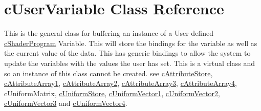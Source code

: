 \hypertarget{classc_user_variable}{
\section{cUserVariable Class Reference}
\label{classc_user_variable}
}


This is the general class for buffering an instance of a User defined \hyperlink{classc_shader_program}{cShaderProgram} Variable. This will store the bindings for the variable as well as the current value of the data. This has generic bindings to allow the system to update the variables with the values the user has set. This is a virtual class and so an instance of this class cannot be created. see \hyperlink{classc_attribute_store}{cAttributeStore}, \hyperlink{classc_attribute_array1}{cAttributeArray1}, \hyperlink{classc_attribute_array2}{cAttributeArray2}, \hyperlink{classc_attribute_array3}{cAttributeArray3}, \hyperlink{classc_attribute_array4}{cAttributeArray4}, cUniformMatrix, \hyperlink{classc_uniform_store}{cUniformStore}, \hyperlink{classc_uniform_vector1}{cUniformVector1}, \hyperlink{classc_uniform_vector2}{cUniformVector2}, \hyperlink{classc_uniform_vector3}{cUniformVector3} and \hyperlink{classc_uniform_vector4}{cUniformVector4}.  



